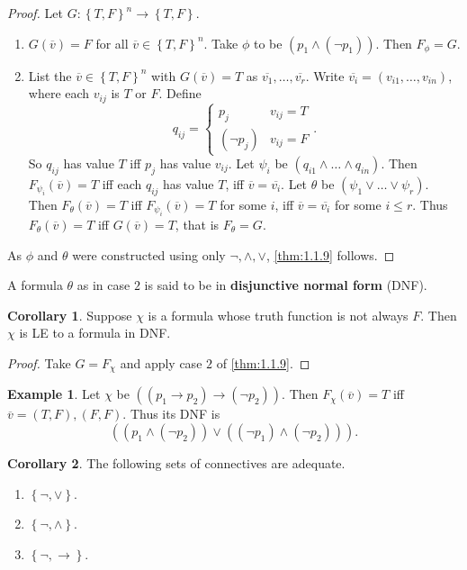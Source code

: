 \documentclass{article}
\newcommand{\rb}[1]{\left( #1 \right)}
\newcommand{\cb}[1]{\left\{ #1 \right\}}
\newcommand{\notb}[1]{\rb{\neg #1}}
\newcommand{\orb}[2]{\rb{#1 \lor #2}}
\newcommand{\andb}[2]{\rb{#1 \land #2}}
\newcommand{\impb}[2]{\rb{#1 \rightarrow #2}}
\theoremstyle{definition}\newtheorem{definition}{Definition}[subsection]
\theoremstyle{definition}\newtheorem{remark}[definition]{Remark}
\theoremstyle{definition}\newtheorem*{example}{Example}
\theoremstyle{definition}\newtheorem*{note}{Note}
\newtheorem{corollary}[definition]{Corollary}
\begin{document}
\begin{proof}
Let $ G : \cb{T, F}^n \to \cb{T, F} $.
\begin{enumerate}
\item $ G\rb{\overline{v}} = F $ for all $ \overline{v} \in \cb{T, F}^n $. Take $ \phi $ to be $ \andb{p_1}{\notb{p_1}} $. Then $ F_\phi = G $.
\item List the $ \overline{v} \in \cb{T, F}^n $ with $ G\rb{\overline{v}} = T $ as $ \overline{v_1}, \dots, \overline{v_r} $. Write $ \overline{v_i} = \rb{v_{i1}, \dots, v_{in}} $, where each $ v_{ij} $ is $ T $ or $ F $. Define
$$ q_{ij} = \begin{cases} p_j & v_{ij} = T \\ \notb{p_j} & v_{ij} = F \end{cases}. $$
So $ q_{ij} $ has value $ T $ iff $ p_j $ has value $ v_{ij} $. Let $ \psi_i $ be $ \rb{q_{i1} \land \dots \land q_{in}} $. Then $ F_{\psi_i}\rb{\overline{v}} = T $ iff each $ q_{ij} $ has value $ T $, iff $ \overline{v} = \overline{v_i} $. Let $ \theta $ be $ \rb{\psi_1 \lor \dots \lor \psi_r} $. Then $ F_\theta\rb{\overline{v}} = T $ iff $ F_{\psi_i}\rb{\overline{v}} = T $ for some $ i $, iff $ \overline{v} = \overline{v_i} $ for some $ i \le r $. Thus $ F_\theta\rb{\overline{v}} = T $ iff $ G\rb{\overline{v}} = T $, that is $ F_\theta = G $.
\end{enumerate}
As $ \phi $ and $ \theta $ were constructed using only $ \neg, \land, \lor $, \ref{thm:1.1.9} follows.
\end{proof}

A formula $ \theta $ as in case $ 2 $ is said to be in \textbf{disjunctive normal form} (DNF).

\begin{corollary}
Suppose $ \chi $ is a formula whose truth function is not always $ F $. Then $ \chi $ is LE to a formula in DNF.
\end{corollary}

\begin{proof}
Take $ G = F_\chi $ and apply case $ 2 $ of \ref{thm:1.1.9}.
\end{proof}

\begin{example}
Let $ \chi $ be $ \impb{\impb{p_1}{p_2}}{\notb{p_2}} $. Then $ F_\chi\rb{\overline{v}} = T $ iff $ \overline{v} = \rb{T, F}, \rb{F, F} $. Thus its DNF is
$$ \orb{\andb{p_1}{\notb{p_2}}}{\andb{\notb{p_1}}{\notb{p_2}}}. $$
\end{example}

\begin{corollary}
The following sets of connectives are adequate.
\begin{enumerate}
\item $ \cb{\neg, \lor} $.
\item $ \cb{\neg, \land} $.
\item $ \cb{\neg, \rightarrow} $.
\end{enumerate}
\end{corollary}
\end{document}
